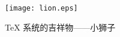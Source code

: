 \begin{figure}[htp]
  \centering
  \texttt{[image: lion.eps]}
  \caption[小狮子]{\TeX{} 系统的吉祥物——小狮子}\label{fig-lion}
\end{figure}
